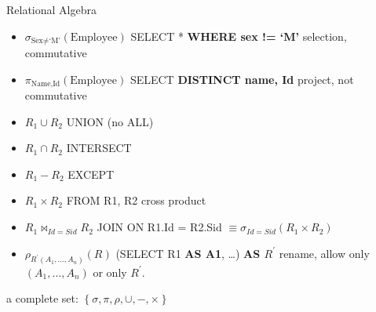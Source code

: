 \documentclass[a4paper]{article}
\begin{document}
\begin{multicols}{3}
\begin{cheatsheetblock}{Relational Algebra}
    \begin{itemize}
        \item $\sigma_{\text {Sex}\neq\text {`M'}} (\text{Employee})$ \hfill SELECT * \textbf{WHERE sex != `M'}
              \subitem selection, commutative
        \item $\pi_{\text {Name}, \text {Id}} (\text {Employee})$ \hfill SELECT \textbf{DISTINCT name, Id}
              \subitem project, not commutative
        \item $R_1 \cup R_2$ \hfill UNION (no ALL)
        \item $R_1 \cap R_2$ \hfill INTERSECT
        \item $R_1 - R_2$ \hfill EXCEPT
        \item $R_1 \times R_2$ \hfill FROM R1, R2
              \subitem cross product
        \item $R_1 \bowtie_{Id = Sid} R_2$ \hfill JOIN ON R1.Id = R2.Sid
              \subitem $\equiv \sigma_{Id = Sid} (R_1 \times R_2)$
        \item $\rho_{R^{\prime}\left(A_1, \dots, A_n\right)}(R)$ \hfill (SELECT R1 \textbf{AS A1}, \dots) \textbf{AS $R^{\prime}$}
              \subitem rename, allow only $\left(A_1, \dots, A_n\right)$ or only $R^{\prime}$.
    \end{itemize}
    a complete set: $\left\{\sigma, \pi, \rho, \cup, -, \times\right\}$
\end{cheatsheetblock}


\end{multicols}
\end{document}
